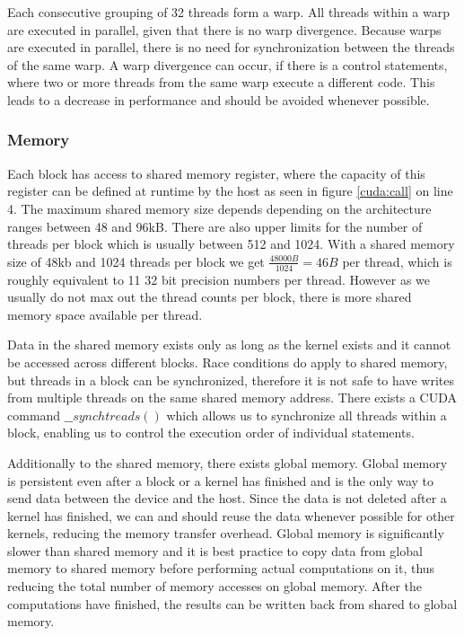 \documentclass[]{article}
\begin{document}
Each consecutive grouping of 32 threads form a warp. All threads within a warp are executed in parallel, given that there is no warp divergence. Because warps are executed in parallel, there is no need for synchronization between the threads of the same warp. A warp divergence can occur, if there is a control statements, where two or more threads from the same warp execute a different code. This leads to a decrease in performance and should be avoided whenever possible.

\subsubsection{Memory}

Each block has access to shared memory register, where the capacity of this register can be defined at runtime by the host as seen in figure \ref{cuda:call} on line 4. The maximum shared memory size depends depending on the architecture ranges between 48 and 96kB. \cite{CUDAGuide} There are also upper limits for the number of threads per block which is usually between 512 and 1024. \cite{CUDAGuide} With a shared memory size of 48kb and 1024 threads per block we get $\frac{48000B}{1024} = 46B$ per thread, which is roughly equivalent to 11 32 bit precision numbers per thread. However as we usually do not max out the thread counts per block, there is more shared memory space available per thread. 

Data in the shared memory exists only as long as the kernel exists and it cannot be accessed across different blocks. Race conditions do apply to shared memory, but threads in a block can be synchronized, therefore it is not safe to have writes from multiple threads on the same shared memory address. There exists a CUDA command $\_\_synchtreads()$ which allows us to synchronize all threads within a block, enabling us to control the execution order of individual statements.

Additionally to the shared memory, there exists global memory. Global memory is persistent even after a block or a kernel has finished and is the only way to send data between the device and the host. Since the data is not deleted after a kernel has finished, we can and should reuse the data whenever possible for other kernels, reducing the memory transfer overhead. Global memory is significantly slower than shared memory and it is best practice to copy data from global memory to shared memory before performing actual computations on it, thus reducing the total number of memory accesses on global memory. After the computations have finished, the results can be written back from shared to global memory.
\end{document}
